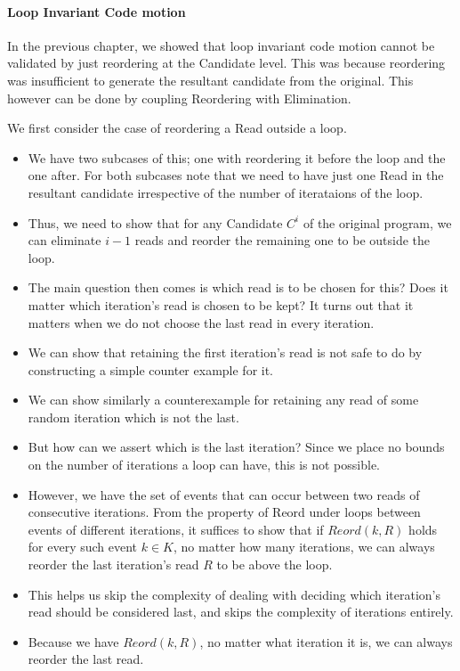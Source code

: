         \paragraph{Loop Invariant Code motion}  

            In the previous chapter, we showed that loop invariant code motion cannot be validated by just reordering at the Candidate level. 
            This was because reordering was insufficient to generate the resultant candidate from the original. 
            This however can be done by coupling Reordering with Elimination. 
            
            We first consider the case of reordering a Read outside a loop.
            \begin{itemize}          
                  \item  We have two subcases of this; one with reordering it before the loop and the one after.
                    For both subcases note that we need to have just one Read in the resultant candidate irrespective of the number of iterataions of the loop. 
                \item Thus, we need to show that for any Candidate  $C^i$ of the original program, we can eliminate $i-1$ reads and reorder the remaining one to be outside the loop. 
                \item The main question then comes is which read is to be chosen for this? Does it matter which iteration's read is chosen to be kept? It turns out that it matters when we do not choose the last read in every iteration.  
                \item We can show that retaining the first iteration's read is not safe to do by constructing a simple counter example for it. 
                \item We can show similarly a counterexample for retaining any read of some random iteration which is not the last. 
                \item But how can we assert which is the last iteration? Since we place no bounds on the number of iterations a loop can have, this is not possible. 
                \item However, we have the set of events that can occur between two reads of consecutive iterations. From the property of Reord under loops between events of different iterations, it suffices to show that if  $Reord(k, R)$ holds for every such event $k \in K$, no matter how many iterations, we can always reorder the last iteration's read $R$ to be above the loop. 
                \item This helps us skip the complexity of dealing with deciding which iteration's read should be considered last, and skips the complexity of iterations entirely. 
                \item Because we have $Reord(k, R)$, no matter what iteration it is, we can always reorder the last read. 
            \end{itemize}

